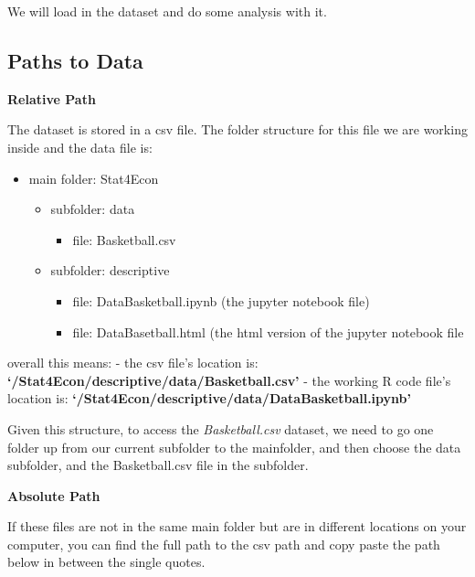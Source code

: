 \documentclass[
]{book}
\providecommand{\tightlist}{%
  \setlength{\itemsep}{0pt}\setlength{\parskip}{0pt}}
\begin{document}
We will load in the dataset and do some analysis with it.

\hypertarget{paths-to-data}{%
\subsection{Paths to Data}\label{paths-to-data}}

\textbf{Relative Path}

The dataset is stored in a csv file. The folder structure for this file we are working inside and the data file is:

\begin{itemize}
\tightlist
\item
  main folder: Stat4Econ

  \begin{itemize}
  \tightlist
  \item
    subfolder: data

    \begin{itemize}
    \tightlist
    \item
      file: Basketball.csv
    \end{itemize}
  \item
    subfolder: descriptive

    \begin{itemize}
    \tightlist
    \item
      file: DataBasketball.ipynb (the jupyter notebook file)
    \item
      file: DataBasetball.html (the html version of the jupyter notebook file
    \end{itemize}
  \end{itemize}
\end{itemize}

overall this means:
- the csv file's location is: \textbf{`/Stat4Econ/descriptive/data/Basketball.csv'}
- the working R code file's location is: \textbf{`/Stat4Econ/descriptive/data/DataBasketball.ipynb'}

Given this structure, to access the \emph{Basketball.csv} dataset, we need to go one folder up from our current subfolder to the mainfolder, and then choose the data subfolder, and the Basketball.csv file in the subfolder.

\textbf{Absolute Path}

If these files are not in the same main folder but are in different locations on your computer, you can find the full path to the csv path and copy paste the path below in between the single quotes.
\end{document}
